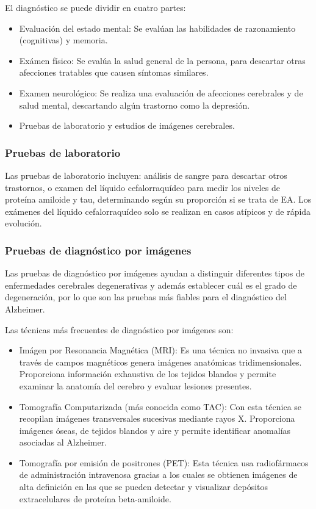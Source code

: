 El diagnóstico se puede dividir en cuatro partes:
\begin{itemize}
    \item Evaluación del estado mental: Se evalúan las habilidades de razonamiento (cognitivas) y memoria.
    \item Exámen físico: Se evalúa la salud general de la persona, para descartar otras afecciones tratables que causen
    síntomas similares.
    \item Examen neurológico: Se realiza una evaluación de afecciones cerebrales y de salud mental, descartando algún
    trastorno como la depresión.
    \item Pruebas de laboratorio y estudios de imágenes cerebrales.\\
\end{itemize}

\subsubsection{Pruebas de laboratorio}\label{subsubsec:pruebas-laboratorio-EA}
Las pruebas de laboratorio incluyen: análisis de sangre para descartar otros trastornos, o examen del líquido
cefalorraquídeo para medir los niveles de proteína amiloide y tau, determinando según su proporción si se trata de EA.
Los exámenes del líquido cefalorraquídeo solo se realizan en casos atípicos y de rápida evolución.

\subsubsection{Pruebas de diagnóstico por imágenes}\label{subsubsec:pruebas-imagenes-EA}
Las pruebas de diagnóstico por imágenes ayudan a distinguir diferentes tipos de enfermedades cerebrales degenerativas y
además establecer cuál es el grado de degeneración, por lo que son las pruebas más fiables para el diagnóstico del
Alzheimer.

Las técnicas más frecuentes de diagnóstico por imágenes son:
\begin{itemize}
    \item Imágen por Resonancia Magnética (MRI): Es una técnica no invasiva que a través de campos magnéticos genera imágenes
    anatómicas tridimensionales.
    Proporciona información exhaustiva de los tejidos blandos y permite examinar la anatomía del cerebro y evaluar
    lesiones presentes.
    \item Tomografía Computarizada (más conocida como TAC): Con esta técnica se recopilan imágenes transversales
    sucesivas mediante rayos X. Proporciona imágenes óseas, de tejidos blandos y aire y permite identificar anomalías
    asociadas al Alzheimer.
    \item Tomografía por emisión de positrones (PET): Esta técnica usa radiofármacos de administración intravenosa
    gracias a los cuales se obtienen imágenes de alta definición en las que se pueden detectar y visualizar depósitos
    extracelulares de proteína beta-amiloide.\\
\end{itemize}

